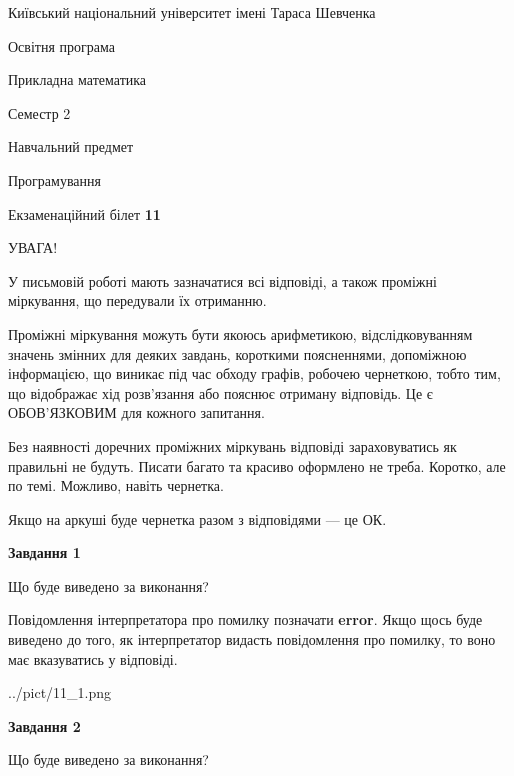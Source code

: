 \documentclass[12pt, ukrainian]{article}
\begin{document}
{{\begin {small}\par
{ \center  Київський національний університет імені Тараса Шевченка \par}
{\parbox {5 cm}{Освітня програма \hfill}{\parbox {7 cm}{Прикладна математика \hfill}}\parbox {6 cm}{\hfill Семестр 2}}\par
{\parbox {5 cm} {Навчальний предмет \hfill}\parbox {7 cm}{Програмування \hfill}\parbox {6cm}{\hfill}\par}\vspace{-7pt} \end{small}}{\center Екзаменаційний білет \No \textbf
{ 11 }\par}}
{
\begin {large}
УВАГА!

У письмовій роботі мають зазначатися всі відповіді, а також проміжні міркування, що передували їх отриманню.

Проміжні міркування можуть бути якоюсь арифметикою, відслідковуванням зна\-чень змінних для деяких завдань,
короткими поясненнями, допоміжною інформацією, що виникає під час обходу графів, робочею чернеткою,
тобто тим, що відображає хід розв’язання або пояснює отриману відповідь.
Це є ОБОВ’ЯЗКОВИМ для кожного запитання.

Без наявності доречних проміжних міркувань відповіді зараховуватись як правиль\-ні не будуть.
Писати багато та красиво оформлено не треба. Коротко, але по темі. Можли\-во, навіть чернетка.

Якщо на аркуші буде чернетка разом з відповідями --- це ОК.

\newpage

{\begin {center}\textbf{Завдання 1}\end {center}}\par
Що буде виведено за виконання?

Повідомлення інтерпретатора про помилку позначати \textbf{error}.
Якщо щось буде виведено до того, як інтерпретатор видасть повідомлення про помилку, 
то воно має вказуватись у відповіді. \par


\begin{center}
	{../pict/11_1.png}
\end{center}
\newpage

{\begin {center}\textbf{Завдання 2}\end {center}}\par
Що буде виведено за виконання?


\end{large}}
\end{document}
